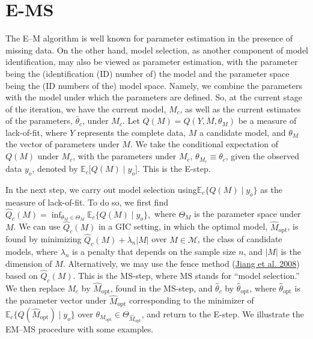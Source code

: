 \documentclass[
  12pt,
]{article}
\begin{document}
\section{E-MS}

The E--M algorithm is well known for parameter estimation in the presence of
missing data. On the other hand, model selection, as another component
of model identification, may also be viewed as parameter estimation,
with the parameter being the (identification (ID) number of) the model
and the parameter space being the (ID numbers of the) model space.
Namely, we combine the parameters with the model under which the
parameters are defined. So, at the current stage of the iteration, we
have the current model, \(M_c\), as well as the current estimates of the
parameters, \(\hat{\theta}_c\), under \(M_c\). Let
\(Q(M) = Q(Y, M, \theta_M)\) be a measure of lack-of-fit, where \(Y\)
represents the complete data, \(M\) a candidate model, and \(\theta_M\)
the vector of parameters under \(M\). We take the conditional
expectation of \(Q(M)\) under \(M_c\), with the parameters under
\(M_c\), \(\theta_{M_c} \equiv \hat{\theta_c}\), given the observed data
\(y_o\), denoted by \(\mathbb{E}_c \big[ Q(M) \mid y_o \big].\) This is
the E-step.

In the next step, we carry out model selection
using\(\mathbb{E}_c \{ Q(M) \mid y_o \}\) as the measure of lack-of-fit.
To do so, we first find
\(\hat{Q}_c(M) = \inf_{\theta_M \in \Theta_M}\mathbb{E}_c \{ Q(M) \mid y_o \},\)
where \(\Theta_M\) is the parameter space under \(M\). We can use
\(\hat{Q}_c(M)\) in a GIC setting, in which the optimal model,
\(\hat{M}_{\text{opt}}\), is found by minimizing
\(\hat{Q}_c(M) + \lambda_n |M|\) over \(M \in \mathcal{M}\), the class
of candidate models, where \(\lambda_n\) is a penalty that depends on
the sample size \(n\), and \(|M|\) is the dimension of \(M\).
Alternatively, we may use the fence method
(\protect\hyperlink{ref-Jiang_2008}{Jiang et al. 2008}) based on
\(\hat{Q}_c(M)\). This is the MS-step, where MS stands for ``model
selection.'' We then replace \(M_c\) by \(\hat{M}_{\text{opt}}\), found
in the MS-step, and \(\hat{\theta}_c\) by \(\hat{\theta}_{\text{opt}}\),
where \(\hat{\theta}_{\text{opt}}\) is the parameter vector under
\(\hat{M}_{\text{opt}}\) corresponding to the minimizer of
\(\mathbb{E}_c \{ Q(\hat{M}_{\text{opt}}) \mid y_o \}\) over
\(\theta_{M_{\text{opt}}} \in \Theta_{\hat{M}_{\text{opt}}}\), and
return to the E-step. We illustrate the EM--MS procedure with some
examples.
\end{document}
